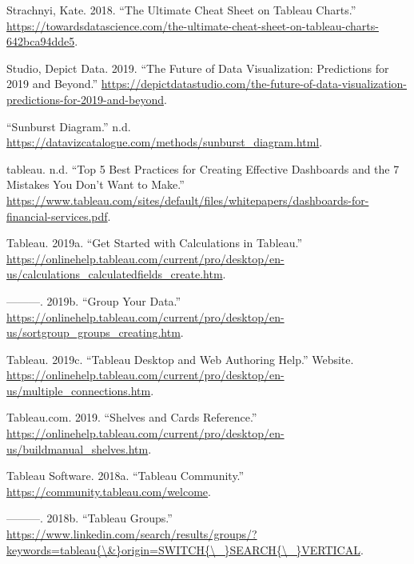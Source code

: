 \documentclass[]{book}
\begin{document}
\leavevmode\hypertarget{ref-Charts_CheatSheet}{}%
Strachnyi, Kate. 2018. ``The Ultimate Cheat Sheet on Tableau Charts.'' \url{https://towardsdatascience.com/the-ultimate-cheat-sheet-on-tableau-charts-642bca94dde5}.

\leavevmode\hypertarget{ref-depictdatastudio}{}%
Studio, Depict Data. 2019. ``The Future of Data Visualization: Predictions for 2019 and Beyond.'' \url{https://depictdatastudio.com/the-future-of-data-visualization-predictions-for-2019-and-beyond}.

\leavevmode\hypertarget{ref-sunburst-diag}{}%
``Sunburst Diagram.'' n.d. \url{https://datavizcatalogue.com/methods/sunburst_diagram.html}.

\leavevmode\hypertarget{ref-dashboard_practices}{}%
tableau. n.d. ``Top 5 Best Practices for Creating Effective Dashboards and the 7 Mistakes You Don't Want to Make.'' \href{\%20https://www.tableau.com/sites/default/files/whitepapers/dashboards-for-financial-services.pdf\%20}{https://www.tableau.com/sites/default/files/whitepapers/dashboards-for-financial-services.pdf}.

\leavevmode\hypertarget{ref-Tableau_Calculated_Fields}{}%
Tableau. 2019a. ``Get Started with Calculations in Tableau.'' \url{https://onlinehelp.tableau.com/current/pro/desktop/en-us/calculations_calculatedfields_create.htm}.

\leavevmode\hypertarget{ref-Tableau_Groups}{}%
---------. 2019b. ``Group Your Data.'' \url{https://onlinehelp.tableau.com/current/pro/desktop/en-us/sortgroup_groups_creating.htm}.

\leavevmode\hypertarget{ref-TableauHelp_connections}{}%
Tableau. 2019c. ``Tableau Desktop and Web Authoring Help.'' Website. \url{https://onlinehelp.tableau.com/current/pro/desktop/en-us/multiple_connections.htm}.

\leavevmode\hypertarget{ref-Tableau_Build_Manual}{}%
Tableau.com. 2019. ``Shelves and Cards Reference.'' \url{https://onlinehelp.tableau.com/current/pro/desktop/en-us/buildmanual_shelves.htm}.

\leavevmode\hypertarget{ref-Tableau_Community}{}%
Tableau Software. 2018a. ``Tableau Community.'' \url{https://community.tableau.com/welcome}.

\leavevmode\hypertarget{ref-LinkedIn_Groups}{}%
---------. 2018b. ``Tableau Groups.'' \href{https://www.linkedin.com/search/results/groups/?keywords=tableau\%7B/\&\%7Dorigin=SWITCH\%7B/_\%7DSEARCH\%7B/_\%7DVERTICAL}{https://www.linkedin.com/search/results/groups/?keywords=tableau\{\textbackslash{}\&\}origin=SWITCH\{\textbackslash{}\_\}SEARCH\{\textbackslash{}\_\}VERTICAL}.
\end{document}

